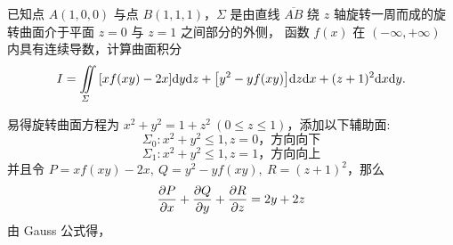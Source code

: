 \begin{example}
    已知点 $A(1,0,0)$ 与点 $B(1,1,1)$，$\varSigma$ 是由直线 $\overline{AB} $ 绕 $z$ 轴旋转一周而成的旋转曲面介于平面 $z=0$ 与 $z=1$ 之间部分的外侧，
    函数 $f(x)$ 在 $(-\infty,+\infty)$ 内具有连续导数，计算曲面积分 $$I=\iint\limits_\varSigma\qty[xf(xy)-2x]\dd y\dd z+\qty[y^2-yf(xy)]\dd z\dd x+(z+1)^2\dd x\dd y.$$
\end{example}
\begin{solution}
    易得旋转曲面方程为 $x^2+y^2=1+z^2~ (0\leqslant z\leqslant 1)$，添加以下辅助面:
    $$\varSigma_0:x^2+y^2\leqslant 1,z=0\text{，方向向下}$$
    $$\varSigma_1:x^2+y^2\leqslant 1,z=1\text{，方向向上}$$
    并且令 $P=xf(xy)-2x,~Q=y^2-yf(xy),~R=(z+1)^2$，那么
    $$\pdv{P}{x}+\pdv{Q}{y}+\pdv{R}{z}=2y+2z$$
    由 Gauss 公式得，
\end{solution}


